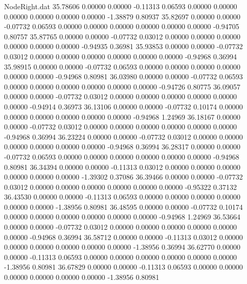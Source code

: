 \begin{filecontents}{NodeRight.dat}
  35.78606    0.00000    0.00000    -0.11313    0.06593    0.00000    0.00000    0.00000    0.00000    0.00000    0.00000   -1.38879    0.80937
  35.82697    0.00000    0.00000    -0.07732    0.06593    0.00000    0.00000    0.00000    0.00000    0.00000    0.00000   -0.94705    0.80757
  35.87765    0.00000    0.00000    -0.07732    0.03012    0.00000    0.00000    0.00000    0.00000    0.00000    0.00000   -0.94935    0.36981
  35.93853    0.00000    0.00000    -0.07732    0.03012    0.00000    0.00000    0.00000    0.00000    0.00000    0.00000   -0.94968    0.36994
  35.98915    0.00000    0.00000    -0.07732    0.06593    0.00000    0.00000    0.00000    0.00000    0.00000    0.00000   -0.94968    0.80981
  36.03980    0.00000    0.00000    -0.07732    0.06593    0.00000    0.00000    0.00000    0.00000    0.00000    0.00000   -0.94726    0.80775
  36.09057    0.00000    0.00000    -0.07732    0.03012    0.00000    0.00000    0.00000    0.00000    0.00000    0.00000   -0.94914    0.36973
  36.13106    0.00000    0.00000    -0.07732    0.10174    0.00000    0.00000    0.00000    0.00000    0.00000    0.00000   -0.94968    1.24969
  36.18167    0.00000    0.00000    -0.07732    0.03012    0.00000    0.00000    0.00000    0.00000    0.00000    0.00000   -0.94968    0.36994
  36.23224    0.00000    0.00000    -0.07732    0.03012    0.00000    0.00000    0.00000    0.00000    0.00000    0.00000   -0.94968    0.36994
  36.28317    0.00000    0.00000    -0.07732    0.06593    0.00000    0.00000    0.00000    0.00000    0.00000    0.00000   -0.94968    0.80981
  36.34394    0.00000    0.00000    -0.11313    0.03012    0.00000    0.00000    0.00000    0.00000    0.00000    0.00000   -1.39302    0.37086
  36.39466    0.00000    0.00000    -0.07732    0.03012    0.00000    0.00000    0.00000    0.00000    0.00000    0.00000   -0.95322    0.37132
  36.43530    0.00000    0.00000    -0.11313    0.06593    0.00000    0.00000    0.00000    0.00000    0.00000    0.00000   -1.38956    0.80981
  36.48595    0.00000    0.00000    -0.07732    0.10174    0.00000    0.00000    0.00000    0.00000    0.00000    0.00000   -0.94968    1.24969
  36.53664    0.00000    0.00000    -0.07732    0.03012    0.00000    0.00000    0.00000    0.00000    0.00000    0.00000   -0.94968    0.36994
  36.58712    0.00000    0.00000    -0.11313    0.03012    0.00000    0.00000    0.00000    0.00000    0.00000    0.00000   -1.38956    0.36994
  36.62770    0.00000    0.00000    -0.11313    0.06593    0.00000    0.00000    0.00000    0.00000    0.00000    0.00000   -1.38956    0.80981
  36.67829    0.00000    0.00000    -0.11313    0.06593    0.00000    0.00000    0.00000    0.00000    0.00000    0.00000   -1.38956    0.80981

\end{filecontents}
